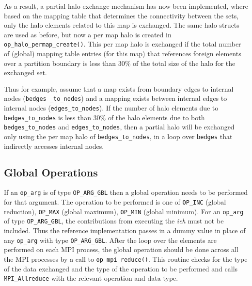 \documentclass[11pt]{article}
\begin{document}
As a result, a partial halo exchange mechanism has now been implemented, where based on the mapping table that
determines the connectivity between the sets, only the halo elements related to this map is exchanged. The same halo
structs are used as before, but now a per map halo is created in \texttt{op\_halo\_permap\_create()}. This per map halo
is exchanged if the total number of (global) mapping table entries (for this map) that references foreign elements over
a partition boundary is less than 30\% of the total size of the halo for the exchanged set.

Thus for example, assume that a map exists from boundary edges to internal nodes (\texttt{bedges \_to\_nodes}) and a
mapping exists between internal edges to internal nodes (\texttt{edges\_to\_nodes}). If the number of halo elements due
to \texttt{bedges\_to\_nodes} is less than 30\% of the halo elements due to both \texttt{bedges\_to\_nodes} and
\texttt{edges\_to\_nodes}, then a partial halo will be exchanged only using the per map halo of
\texttt{bedges\_to\_nodes}, in a loop over \texttt{bedges} that indirectly accesses internal nodes.



\subsection{Global Operations}\label{subsec/globalops}

If an \texttt{op\_arg} is of type \texttt{OP\_ARG\_GBL} then a global operation needs to be performed for that argument.
The operation to be performed is one of \texttt{OP\_INC} (global reduction), \texttt{OP\_MAX} (global maximum),
\texttt{OP\_MIN} (global minimum). For an \texttt{op\_arg} of type \texttt{OP\_ARG\_GBL}, the contributions from
executing the \textit{ieh} must not be included. Thus the reference implementation passes in a dummy value in place of
any \texttt{op\_arg} with type \texttt{OP\_ARG\_GBL}. After the loop over the elements are performed on each MPI
process, the global operation should be done across all the MPI processes by a call to \texttt{op\_mpi\_reduce()}. This
routine checks for the type of the data exchanged and the type of the operation to be performed and calls
\texttt{MPI\_Allreduce} with the relevant operation and data type.

\end{document}
